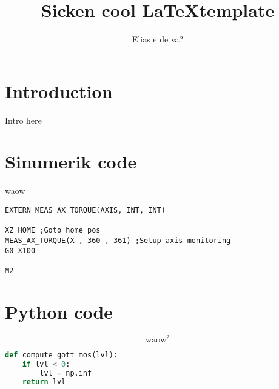 

\title{Sicken cool \LaTeX template}
\author{Elias e de va?}





\section{Introduction}
Intro here

\section{Sinumerik code}
waow

\begin{lstlisting}[language=sinumerik,caption=Test-program used during test runs.]
EXTERN MEAS_AX_TORQUE(AXIS, INT, INT)

XZ_HOME ;Goto home pos
MEAS_AX_TORQUE(X , 360 , 361) ;Setup axis monitoring
G0 X100

M2
\end{lstlisting}

\section{Python code}

\begin{equation}
\text{waow}^2
\end{equation}

\begin{lstlisting}[language=python,caption=Python 4 life <3]
def compute_gott_mos(lvl):
	if lvl < 0:
		lvl = np.inf 
	return lvl


\end{lstlisting}

% 



